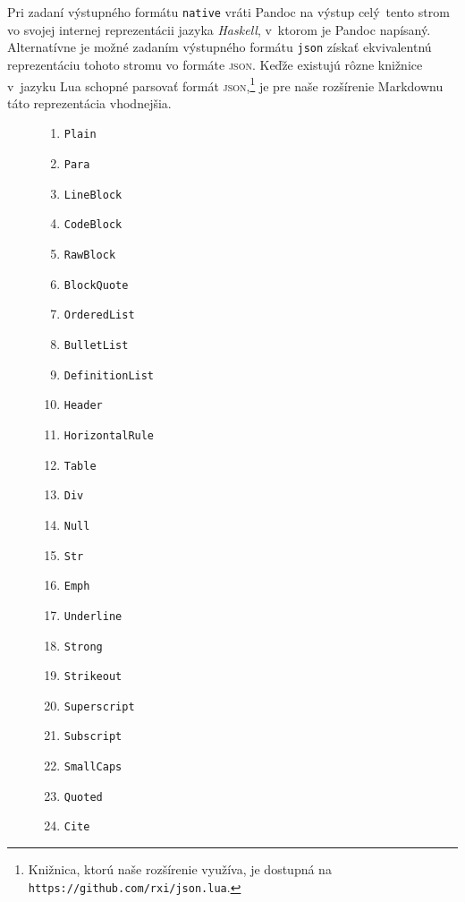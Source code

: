 \documentclass[
  digital,     %
  oneside,     %
  nosansbold,  %
  nocolorbold, %
  lof,         %
  lot,         %
]{fithesis4}
\begin{document}
Pri zadaní výstupného formátu \texttt{native} vráti Pandoc na výstup celý tento strom vo svojej internej reprezentácii jazyka \emph{Haskell}, v~ktorom je Pandoc napísaný. Alternatívne je možné zadaním výstupného formátu \texttt{json} získať ekvivalentnú reprezentáciu tohoto stromu vo formáte \textsc{json}. Keďže existujú rôzne knižnice v~jazyku Lua schopné parsovať formát \textsc{json},\footnote{Knižnica, ktorú naše rozšírenie využíva, je dostupná na \texttt{https://github.com/rxi/json.lua}.} je pre naše rozšírenie Markdownu táto reprezentácia vhodnejšia.


\begin{figure}
  \centering
  \begin{multicols}{2}
    \begin{enumerate}
      \item \texttt{Plain}
      \item \texttt{Para}
      \item \texttt{LineBlock}
      \item \texttt{CodeBlock}
      \item \texttt{RawBlock}
      \item \texttt{BlockQuote}
      \item \texttt{OrderedList}
      \item \texttt{BulletList}
      \item \texttt{DefinitionList}
      \item \texttt{Header}
      \item \texttt{HorizontalRule}
      \item \texttt{Table}
      \item \texttt{Div}
      \item \texttt{Null}
      \item \texttt{Str}
      \item \texttt{Emph}
      \item \texttt{Underline}
      \item \texttt{Strong}
      \item \texttt{Strikeout}
      \item \texttt{Superscript}
      \item \texttt{Subscript}
      \item \texttt{SmallCaps}
      \item \texttt{Quoted}
      \item \texttt{Cite}

\end{enumerate}
\end{multicols}
\end{figure}
\end{document}
